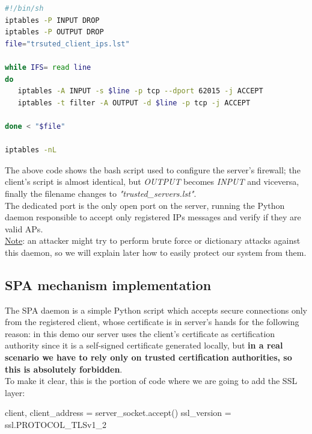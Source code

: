 \documentclass[12pt]{report}
\begin{document}
{\clearpage
\begin{center}
  \lstset{%
    caption=Server's firewall configuration script,
    basicstyle=\ttfamily\small\bfseries,
    frame=tb
  }
\begin{lstlisting}[language=bash]
#!/bin/sh
iptables -P INPUT DROP
iptables -P OUTPUT DROP
file="trsuted_client_ips.lst"

while IFS= read line
do
   iptables -A INPUT -s $line -p tcp --dport 62015 -j ACCEPT
   iptables -t filter -A OUTPUT -d $line -p tcp -j ACCEPT

done < "$file"

iptables -nL

\end{lstlisting}
\end{center}

The above code shows the bash script used to configure the server's firewall; the client's script is almost identical, but \textit{OUTPUT} becomes \textit{INPUT} and viceversa, finally the filename changes to \textit{"trusted\_servers.lst"}.\\


The dedicated port is the only open port on the server, running the Python daemon responsible to accept only registered IPs messages and verify if they are valid APs.\\
\underline{Note}:  an attacker might try to perform brute force or dictionary attacks against this daemon, so we will explain later how to easily protect our system from them.\\

\subsection{SPA mechanism implementation}
\bigskip

The SPA daemon is a simple Python script which accepts secure connections only from the registered client, whose certificate is in server's hands for the following reason: in this demo our server uses the client's certificate as certification authority since it is a self-signed certificate generated locally, but \textbf{in a real scenario we have to rely only on trusted certification authorities, so this is absolutely forbidden}.\\
To make it clear, this is the portion of code where we are going to add the SSL layer:\\

\begin{python}
client, client_address = server_socket.accept()
ssl_version = ssl.PROTOCOL_TLSv1_2


\end{python}}
\end{document}

